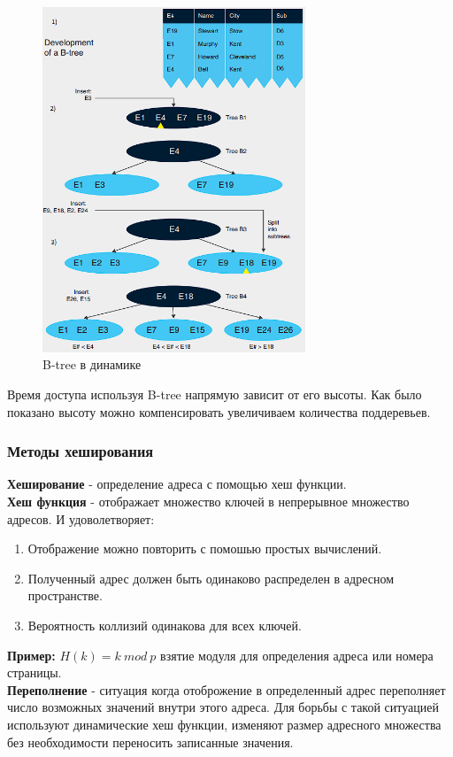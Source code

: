 \documentclass{article}
\begin{document}
\begin{figure}[h]
    \centering
    \includegraphics[width=0.7\textwidth]{images/btree.png}
    \caption{B-tree в динамике}
    \label{img2}
\end{figure}
\newpage
Время доступа используя B-tree напрямую зависит от его высоты. Как было показано высоту можно компенсировать увеличиваем количества поддеревьев.

\subsubsection{Методы хеширования}
\textbf{Хеширование} - определение адреса с помощью хеш функции.\\
\textbf{Хеш функция} - отображает множество ключей в непрерывное множество адресов. И удоволетворяет:
\begin{enumerate}
    \item Отображение можно повторить с помошью простых вычислений.
    \item Полученный адрес должен быть одинаково распределен в адресном пространстве.
    \item Вероятность коллизий одинакова для всех ключей.
\end{enumerate}
\textbf{Пример:} $H(k) = k \: mod \: p$ взятие модуля для определения адреса или номера страницы.\\
\textbf{Переполнение} - ситуация когда отоброжение в определенный адрес переполняет число возможных значений внутри этого адреса. Для борьбы с такой ситуацией используют динамические хеш функции, изменяют размер адресного множества без необходимости переносить записанные значения.
\end{document}
